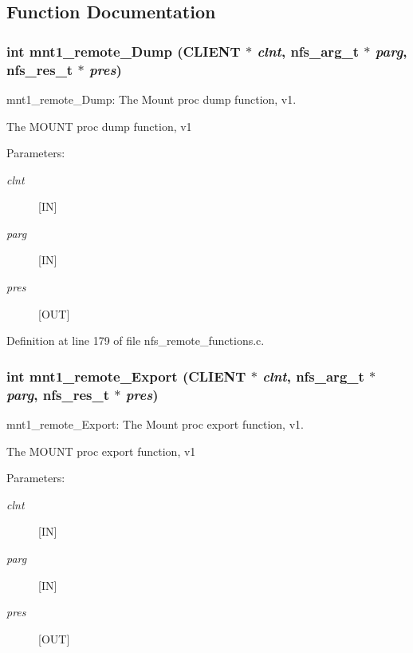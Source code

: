 \subsection{Function Documentation}
\subsubsection[{mnt1\_\-remote\_\-Dump}]{\setlength{\rightskip}{0pt plus 5cm}int mnt1\_\-remote\_\-Dump (CLIENT $\ast$ {\em clnt}, \/  nfs\_\-arg\_\-t $\ast$ {\em parg}, \/  nfs\_\-res\_\-t $\ast$ {\em pres})}\label{group__MNTprocs_g3fb6c5e8cf31193ab707e76f17a10606}


mnt1\_\-remote\_\-Dump: The Mount proc dump function, v1.

The MOUNT proc dump function, v1

\begin{Desc}
\item[Parameters:]
\begin{description}
\item[{\em clnt}][IN] \item[{\em parg}][IN] \item[{\em pres}][OUT] \end{description}
\end{Desc}


Definition at line 179 of file nfs\_\-remote\_\-functions.c.
\subsubsection[{mnt1\_\-remote\_\-Export}]{\setlength{\rightskip}{0pt plus 5cm}int mnt1\_\-remote\_\-Export (CLIENT $\ast$ {\em clnt}, \/  nfs\_\-arg\_\-t $\ast$ {\em parg}, \/  nfs\_\-res\_\-t $\ast$ {\em pres})}\label{group__MNTprocs_g55294cc352b3688224a76aa914e4dad1}


mnt1\_\-remote\_\-Export: The Mount proc export function, v1.

The MOUNT proc export function, v1

\begin{Desc}
\item[Parameters:]
\begin{description}
\item[{\em clnt}][IN] \item[{\em parg}][IN] \item[{\em pres}][OUT] \end{description}
\end{Desc}


